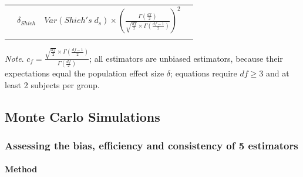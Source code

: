 \documentclass[
  man,floatsintext]{apa6}
\begin{document}
\begin{landscape}
\begin{longtable}[]{@{}lccc@{}}
\begin{minipage}[t]{0.18\columnwidth}
\end{minipage} & \begin{minipage}[t]{0.16\columnwidth}\centering
\(\delta_{Shieh}\)\strut
\end{minipage} & \begin{minipage}[t]{0.45\columnwidth}\centering
\(Var(Shieh's \; d_s) \times \left( \frac{\Gamma\left(\frac{df}{2} \right)}{\sqrt{\frac{df}{2}} \times \Gamma \left( \frac{df-1}{2}\right)}\right)^2\)\strut
\end{minipage}\tabularnewline
\begin{minipage}[t]{0.10\columnwidth}\raggedright
\strut
\end{minipage} & \begin{minipage}[t]{0.18\columnwidth}\centering
\strut
\end{minipage} & \begin{minipage}[t]{0.16\columnwidth}\centering
\strut
\end{minipage} & \begin{minipage}[t]{0.45\columnwidth}\centering
\strut
\end{minipage}\tabularnewline
\bottomrule
\end{longtable}

\emph{Note}. \(c_f=\frac{\sqrt{\frac{df}{2}} \times \Gamma\left( \frac{df-1}{2}\right)}{\Gamma\left( \frac{df}{2}\right)}\); all estimators are unbiased estimators, because their expectations equal the population effect size \(\delta\); equations require \(df \ge 3\) and at least 2 subjects per group.

\end{landscape}
\newpage

\hypertarget{monte-carlo-simulations}{%
\subsection{Monte Carlo Simulations}\label{monte-carlo-simulations}}

\hypertarget{assessing-the-bias-efficiency-and-consistency-of-5-estimators}{%
\subsubsection{Assessing the bias, efficiency and consistency of 5 estimators}\label{assessing-the-bias-efficiency-and-consistency-of-5-estimators}}

\hypertarget{method}{%
\paragraph{Method}\label{method}}
\end{document}

